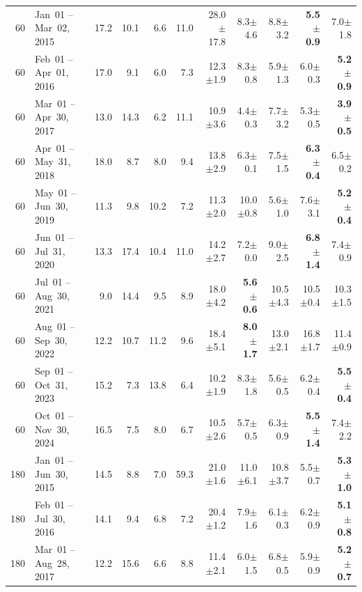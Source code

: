 \begin{longtable}{r l r r r r r r r r r}
60 & Jan~01 -- Mar~02, 2015 & 17.2 & 10.1 & 6.6 & 11.0 & 28.0{\tiny$\pm$17.8} & 8.3{\tiny$\pm$4.6} & 8.8{\tiny$\pm$3.2} & \textbf{5.5{\tiny$\pm$0.9}} & 7.0{\tiny$\pm$1.8} \\
60 & Feb~01 -- Apr~01, 2016 & 17.0 & 9.1 & 6.0 & 7.3 & 12.3{\tiny$\pm$1.9} & 8.3{\tiny$\pm$0.8} & 5.9{\tiny$\pm$1.3} & 6.0{\tiny$\pm$0.3} & \textbf{5.2{\tiny$\pm$0.9}} \\
60 & Mar~01 -- Apr~30, 2017 & 13.0 & 14.3 & 6.2 & 11.1 & 10.9{\tiny$\pm$3.6} & 4.4{\tiny$\pm$0.3} & 7.7{\tiny$\pm$3.2} & 5.3{\tiny$\pm$0.5} & \textbf{3.9{\tiny$\pm$0.5}} \\
60 & Apr~01 -- May~31, 2018 & 18.0 & 8.7 & 8.0 & 9.4 & 13.8{\tiny$\pm$2.9} & 6.3{\tiny$\pm$0.1} & 7.5{\tiny$\pm$1.5} & \textbf{6.3{\tiny$\pm$0.4}} & 6.5{\tiny$\pm$0.2} \\
60 & May~01 -- Jun~30, 2019 & 11.3 & 9.8 & 10.2 & 7.2 & 11.3{\tiny$\pm$2.0} & 10.0{\tiny$\pm$0.8} & 5.6{\tiny$\pm$1.0} & 7.6{\tiny$\pm$3.1} & \textbf{5.2{\tiny$\pm$0.4}} \\
60 & Jun~01 -- Jul~31, 2020 & 13.3 & 17.4 & 10.4 & 11.0 & 14.2{\tiny$\pm$2.7} & 7.2{\tiny$\pm$0.0} & 9.0{\tiny$\pm$2.5} & \textbf{6.8{\tiny$\pm$1.4}} & 7.4{\tiny$\pm$0.9} \\
60 & Jul~01 -- Aug~30, 2021 & 9.0 & 14.4 & 9.5 & 8.9 & 18.0{\tiny$\pm$4.2} & \textbf{5.6{\tiny$\pm$0.6}} & 10.5{\tiny$\pm$4.3} & 10.5{\tiny$\pm$0.4} & 10.3{\tiny$\pm$1.5} \\
60 & Aug~01 -- Sep~30, 2022 & 12.2 & 10.7 & 11.2 & 9.6 & 18.4{\tiny$\pm$5.1} & \textbf{8.0{\tiny$\pm$1.7}} & 13.0{\tiny$\pm$2.1} & 16.8{\tiny$\pm$1.7} & 11.4{\tiny$\pm$0.9} \\
60 & Sep~01 -- Oct~31, 2023 & 15.2 & 7.3 & 13.8 & 6.4 & 10.2{\tiny$\pm$1.9} & 8.3{\tiny$\pm$1.8} & 5.6{\tiny$\pm$0.5} & 6.2{\tiny$\pm$0.4} & \textbf{5.5{\tiny$\pm$0.4}} \\
60 & Oct~01 -- Nov~30, 2024 & 16.5 & 7.5 & 8.0 & 6.7 & 10.5{\tiny$\pm$2.6} & 5.7{\tiny$\pm$0.5} & 6.3{\tiny$\pm$0.9} & \textbf{5.5{\tiny$\pm$1.4}} & 7.4{\tiny$\pm$2.2} \\
\midrule
180 & Jan~01 -- Jun~30, 2015 & 14.5 & 8.8 & 7.0 & 59.3 & 21.0{\tiny$\pm$1.6} & 11.0{\tiny$\pm$6.1} & 10.8{\tiny$\pm$3.7} & 5.5{\tiny$\pm$0.7} & \textbf{5.3{\tiny$\pm$1.0}} \\
180 & Feb~01 -- Jul~30, 2016 & 14.1 & 9.4 & 6.8 & 7.2 & 20.4{\tiny$\pm$1.2} & 7.9{\tiny$\pm$1.6} & 6.1{\tiny$\pm$0.3} & 6.2{\tiny$\pm$0.9} & \textbf{5.1{\tiny$\pm$0.8}} \\
180 & Mar~01 -- Aug~28, 2017 & 12.2 & 15.6 & 6.6 & 8.8 & 11.4{\tiny$\pm$2.1} & 6.0{\tiny$\pm$1.5} & 6.8{\tiny$\pm$0.5} & 5.9{\tiny$\pm$0.9} & \textbf{5.2{\tiny$\pm$0.7}} \\

\end{longtable}
